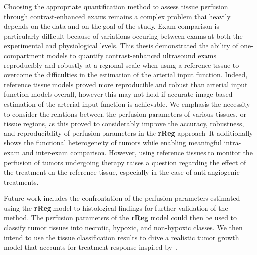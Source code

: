 Choosing the appropriate quantification method to assess tissue perfusion through contrast-enhanced exams remains a complex problem that heavily depends on the data and on the goal of the study.
Exam comparison is particularly difficult because of variations occuring between exams at both the experimental and physiological levels.
This thesis demonstrated the ability of one-compartment models to quantify contrast-enhanced ultrasound exams reproducibly and robustly at a regional scale when using a reference tissue to overcome the difficulties in the estimation of the arterial input function.
Indeed, reference tissue models proved more reproducible and robust than arterial input function models overall, however this may not hold if accurate image-based estimation of the arterial input function is achievable. 
We emphasis the necessity to consider the relations between the perfusion parameters of various tissues, or tissue regions, as this proved to considerably improve the accuracy, robustness, and reproducibility of perfusion parameters in the \textbf{rReg} approach.
It additionally shows the functional heterogeneity of tumors while enabling meaningful intra-exam and inter-exam comparison.
However, using reference tissues to monitor the perfusion of tumors undergoing therapy raises a question regarding the effect of the treatment on the reference tissue, especially in the case of anti-angiogenic treatments.

Future work includes the confrontation of the perfusion parameters estimated using the \textbf{rReg} model to histological findings for further validation of the method.
The perfusion parameters of the \textbf{rReg} model could then be used to classify tumor tissues into necrotic, hypoxic, and non-hypoxic classes.
We then intend to use the tissue classification results to drive a realistic tumor growth model that accounts for treatment response inspired by~\citet{Ribba:2011cl}.

\newpage

